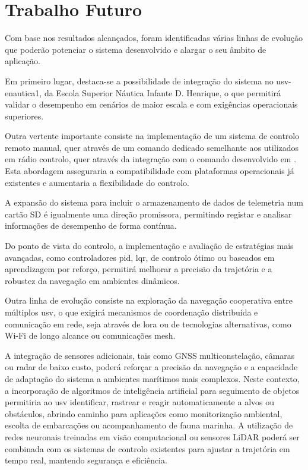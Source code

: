 \section{Trabalho Futuro}
\label{sec:trabalho-futuro}

Com base nos resultados alcançados, foram identificadas várias linhas de evolução que poderão potenciar o sistema desenvolvido e alargar o seu âmbito de aplicação.  

Em primeiro lugar, destaca-se a possibilidade de integração do sistema no \gls{usv}-enautica1, da Escola Superior Náutica Infante D. Henrique, o que permitirá validar o desempenho em cenários de maior escala e com exigências operacionais superiores.  

Outra vertente importante consiste na implementação de um sistema de controlo remoto manual, quer através de um comando dedicado semelhante aos utilizados em rádio controlo, quer através da integração com o comando desenvolvido em \cite{catamara-telecomandado}. Esta abordagem asseguraria a compatibilidade com plataformas operacionais já existentes e aumentaria a flexibilidade do controlo.  

A expansão do sistema para incluir o armazenamento de dados de telemetria num cartão SD é igualmente uma direção promissora, permitindo registar e analisar informações de desempenho de forma contínua.  

Do ponto de vista do controlo, a implementação e avaliação de estratégias mais avançadas, como controladores \gls{pid}, \gls{lqr}, de controlo ótimo ou baseados em aprendizagem por reforço, permitirá melhorar a precisão da trajetória e a robustez da navegação em ambientes dinâmicos.  

Outra linha de evolução consiste na exploração da navegação cooperativa entre múltiplos \gls{usv}, o que exigirá mecanismos de coordenação distribuída e comunicação em rede, seja através de \gls{lora} ou de tecnologias alternativas, como Wi-Fi de longo alcance ou comunicações mesh.  

A integração de sensores adicionais, tais como GNSS multiconstelação, câmaras ou radar de baixo custo, poderá reforçar a precisão da navegação e a capacidade de adaptação do sistema a ambientes marítimos mais complexos. Neste contexto, a incorporação de algoritmos de inteligência artificial para seguimento de objetos permitiria ao \gls{usv} identificar, rastrear e reagir automaticamente a alvos ou obstáculos, abrindo caminho para aplicações como monitorização ambiental, escolta de embarcações ou acompanhamento de fauna marinha. A utilização de redes neuronais treinadas em visão computacional ou sensores LiDAR poderá ser combinada com os sistemas de controlo existentes para ajustar a trajetória em tempo real, mantendo segurança e eficiência.  


